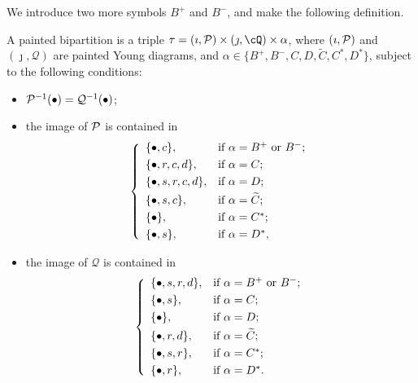 \documentclass[counting_main.tex]{subfiles}
\begin{document}
We introduce two more symbols $B^+$ and $B^-$, and make the following
definition.
\begin{defn}\label{defpbp0}
  A painted bipartition is a triple
  $\tau=(\imath, \CP)\times (\jmath, \cQ)\times \alpha$, where $(\imath, \mathcal{P})$
  and $ (\jmath, \mathcal Q)$ are painted Young diagrams, and
  $\alpha\in \{B^+,B^-, C,D,\widetilde {C}, C^*, D^*\}$, subject to the
  following conditions:
  \begin{itemize}

    \item $\mathcal{P}^{-1}(\bullet)=\mathcal Q^{-1}(\bullet)$;
    \item the image of $\mathcal{P}$ is contained in
          \[
          \left\{
          \begin{array}{ll}
            \{\bullet, c\}, &\hbox{if $\alpha=B^+$ or $B^-$}; \smallskip\\
            \{\bullet,  r, c,d\}, &\hbox{if $\alpha=C$}; \smallskip\\
            \{\bullet, s, r, c,d\}, &\hbox{if $\alpha=D$}; \smallskip\\
            \{\bullet, s, c\}, &\hbox{if $\alpha=\widetilde{ C}$}; \smallskip \\
            \{\bullet\}, &\hbox{if $\alpha=C^*$}; \smallskip \\
            \{\bullet, s\}, &\hbox{if $\alpha=D^*$},\\
          \end{array}
          \right.
          \]
    \item the image of $\mathcal Q$ is contained in
          \[
          \left\{
          \begin{array}{ll}
            \{\bullet, s, r, d\}, &\hbox{if $\alpha=B^+$ or $B^-$}; \smallskip\\
            \{\bullet, s\}, &\hbox{if $\alpha=C$}; \smallskip\\
            \{\bullet\}, &\hbox{if $\alpha=D$}; \smallskip\\
            \{\bullet, r, d\}, &\hbox{if $\alpha=\widetilde{ C}$}; \smallskip\\
            \{\bullet, s,r\}, &\hbox{if $\alpha=C^*$}; \smallskip \\
            \{\bullet, r\}, &\hbox{if $\alpha=D^*$}.
          \end{array}
          \right.
          \]

  \end{itemize}
\end{defn}
\end{document}
